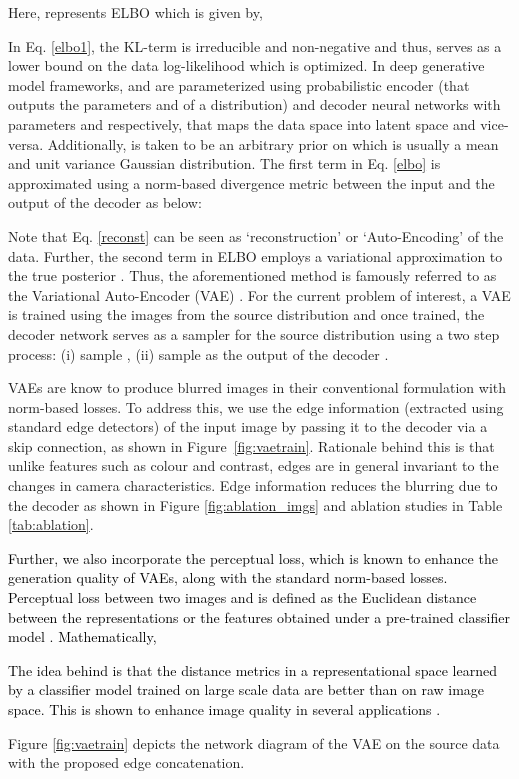 \documentclass[journal,twoside,web]{IEEEtran}
\newcommand{\cc}{\textcolor{black}}
\newcommand{\bb}{\textcolor{black}}
\begin{document}
 Here,  represents ELBO which is given by,


In Eq. \ref{elbo1}, the KL-term is irreducible and non-negative and thus,   serves as a lower bound on the data log-likelihood which is optimized. In deep generative model frameworks,  and  are parameterized using probabilistic encoder  (that outputs the parameters  and  of a distribution)  and decoder  neural networks with parameters  and  respectively, that maps the data space into latent space and vice-versa. Additionally,   is taken to be an arbitrary prior on  which is usually a  mean and unit variance Gaussian distribution. The first term in Eq. \ref{elbo} is approximated using a norm-based divergence metric between the input and the output of the decoder as below:

\cc{
}

Note that Eq. \ref{reconst} can be seen as `reconstruction' or `Auto-Encoding' of the data. Further, the second term in ELBO employs a variational approximation to the true posterior . Thus, the aforementioned method is famously referred to as the Variational Auto-Encoder (VAE) \cite{kingma2013auto}. For the current problem of interest, a VAE is trained using the images from the source distribution  and once trained,  the decoder network serves as a sampler for the source distribution using a two step process: (i) sample , (ii) sample   as the output of the decoder .

VAEs are know to produce blurred images in their conventional formulation with norm-based losses. To address this, we use the edge information (extracted using standard edge detectors) of the input image by passing it to the decoder via a skip connection, as shown in Figure~\ref{fig:vaetrain}. Rationale behind this is that unlike features such as colour and contrast, edges are in general invariant to the changes in camera characteristics. Edge information reduces the blurring due to the decoder as shown in Figure \ref{fig:ablation_imgs} and ablation studies in Table \ref{tab:ablation}. \par \bb{Further, we also incorporate the perceptual loss, which is known to enhance the generation quality of VAEs, along with the standard norm-based losses. Perceptual loss  between two images  and  is defined as the Euclidean distance between the representations or the features obtained under a pre-trained classifier model . Mathematically,

The idea behind  is that the distance metrics in a representational space learned by a classifier model trained on large scale data are better than on raw image space. This is shown to enhance image quality in several applications \cite{yang2019unsupervised}.} Figure \ref{fig:vaetrain} depicts the network diagram of the VAE on the source data with the proposed edge concatenation. 
\setlength{\textfloatsep}{0pt}
\end{document}
